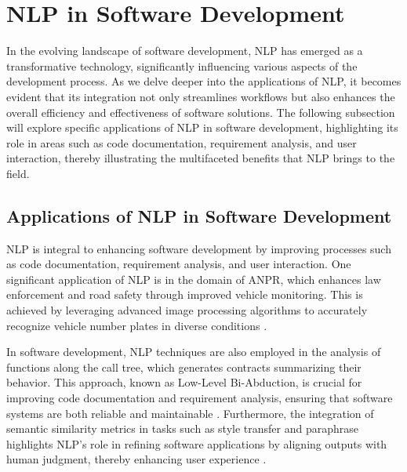 \section{NLP in Software Development} \label{sec:NLP in Software Development}

In the evolving landscape of software development, NLP has emerged as a transformative technology, significantly influencing various aspects of the development process. As we delve deeper into the applications of NLP, it becomes evident that its integration not only streamlines workflows but also enhances the overall efficiency and effectiveness of software solutions. The following subsection will explore specific applications of NLP in software development, highlighting its role in areas such as code documentation, requirement analysis, and user interaction, thereby illustrating the multifaceted benefits that NLP brings to the field.






\subsection{Applications of NLP in Software Development} \label{subsec:Applications of NLP in Software Development}

NLP is integral to enhancing software development by improving processes such as code documentation, requirement analysis, and user interaction. One significant application of NLP is in the domain of ANPR, which enhances law enforcement and road safety through improved vehicle monitoring. This is achieved by leveraging advanced image processing algorithms to accurately recognize vehicle number plates in diverse conditions \cite{adak2022automaticnumberplaterecognition}. 

In software development, NLP techniques are also employed in the analysis of functions along the call tree, which generates contracts summarizing their behavior. This approach, known as Low-Level Bi-Abduction, is crucial for improving code documentation and requirement analysis, ensuring that software systems are both reliable and maintainable \cite{holk2022lowlevelbiabduction}. Furthermore, the integration of semantic similarity metrics in tasks such as style transfer and paraphrase highlights NLP's role in refining software applications by aligning outputs with human judgment, thereby enhancing user experience \cite{yamshchikov2020styletransferparaphraselookingsensible}.

